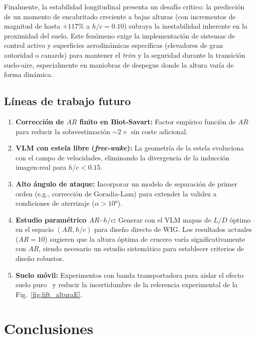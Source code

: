 \documentclass[twocolumn]{article}
\begin{document}
Finalmente, la estabilidad longitudinal presenta un desafío crítico: la predicción de un momento de encabritado creciente a bajas alturas (con incrementos de magnitud de hasta $+117\%$ a $h/c = 0.10$) subraya la inestabilidad inherente en la proximidad del suelo. Este fenómeno exige la implementación de sistemas de control activo y superficies aerodinámicas específicas (elevadores de gran autoridad o canards) para mantener el \textit{trim} y la seguridad durante la transición suelo-aire, especialmente en maniobras de despegue donde la altura varía de forma dinámica.

\subsection{Líneas de trabajo futuro}

\begin{enumerate}
    \item \textbf{Corrección de $AR$ finito en Biot-Savart:} Factor empírico función de $AR$ para reducir la sobreestimación $\sim 2\times$ sin coste adicional.
    \item \textbf{VLM con estela libre (\textit{free-wake}):} La geometría de la estela evoluciona con el campo de velocidades, eliminando la divergencia de la inducción imagen-real para $h/c < 0.15$.
    \item \textbf{Alto ángulo de ataque:} Incorporar un modelo de separación de primer orden (e.g., corrección de Goradia-Lam) para extender la validez a condiciones de aterrizaje ($\alpha > 10°$).
  \item \textbf{Estudio paramétrico $AR$--$h/c$:} Generar con el VLM mapas de $L/D$ óptimo en el espacio $(\mathit{AR}, h/c)$ para diseño directo de WIG. Los resultados actuales ($\mathit{AR} = 10$) sugieren que la altura óptima de crucero varía significativamente con $\mathit{AR}$, siendo necesario un estudio sistemático para establecer criterios de diseño robustos.
    \item \textbf{Suelo móvil:} Experimentos con banda transportadora para aislar el efecto suelo puro~\cite{zerihan2000} y reducir la incertidumbre de la referencia experimental de la Fig.~\ref{fig:lift_alturaE}.
\end{enumerate}

\section{Conclusiones}
\end{document}
